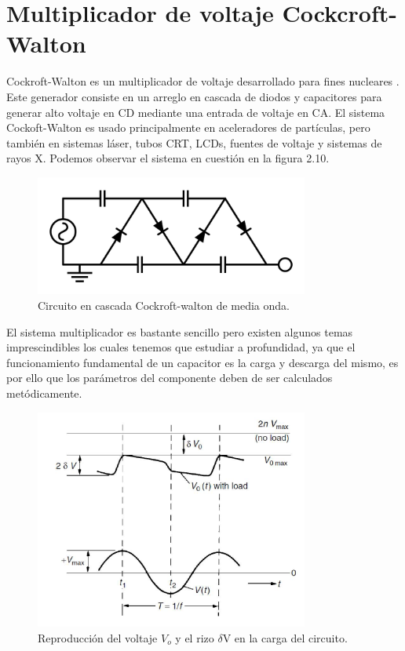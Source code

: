  
\newpage
\section{Multiplicador de voltaje Cockcroft-Walton}
Cockroft-Walton es un multiplicador de voltaje desarrollado para fines nucleares \cite{CERN}. Este generador consiste en un arreglo en cascada de diodos y capacitores para generar alto voltaje en CD mediante una entrada de voltaje en CA. El sistema Cockoft-Walton es usado principalmente en aceleradores de partículas, pero también en sistemas láser, tubos CRT, LCDs, fuentes de voltaje y sistemas de rayos X. Podemos observar el sistema en cuestión en la figura 2.10.  

\begin{figure}[H]
\centering
\includegraphics[width=9cm]{capitulo2/figs/circ.png}
\caption{ Circuito en cascada Cockroft-walton de media onda.}
\end{figure}
El sistema multiplicador es bastante sencillo pero existen algunos temas imprescindibles los cuales tenemos que estudiar a profundidad, ya que el funcionamiento fundamental de un capacitor es la carga y descarga del mismo, es por ello que los parámetros del componente deben de ser calculados metódicamente.

\begin{figure}[H]
\centering
\includegraphics[width=9cm]{capitulo2/figs/riso.png}
\caption{ Reproducción del voltaje $V_{o}$ y el rizo $\delta$V en la carga del circuito.}
\end{figure}

